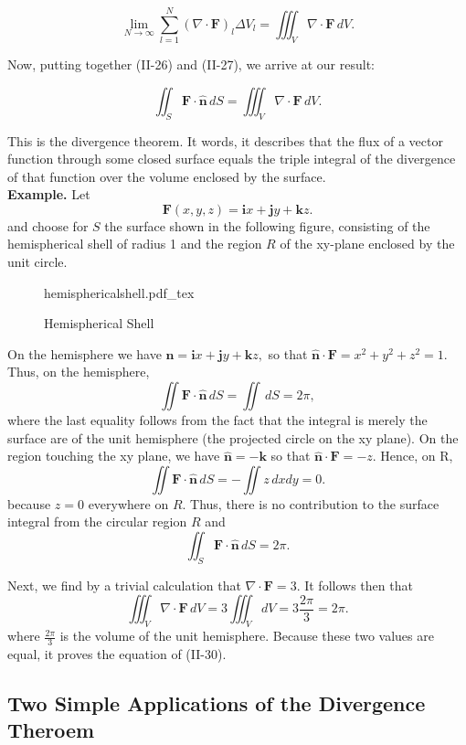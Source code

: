 \documentclass[11pt]{article}
\newcommand{\incfig}[2][1]{%
    \def\svgwidth{#1\columnwidth}
    {#2.pdf_tex}
}
\begin{document}
\[
	\lim_{N \rightarrow \infty} \sum_{l=1}^N (\nabla \cdot \mathbf{F})_l \Delta V_l = \iiint_V \nabla  \cdot \mathbf{F} \, dV \tag{II-29}
.\]

Now, putting together (II-26) and (II-27), we arrive at our result:

\[
	\iint_S \mathbf{F} \cdot \mathbf{\hat{n}} \, dS = \iiint_V \nabla \cdot \mathbf{F} \, dV \tag{II-30}
.\]

This is the divergence theorem. It words, it describes that the flux of a vector function through some closed surface
equals the triple integral of the divergence of that function over the volume enclosed by the surface. \\
\textbf{Example.} Let
\[
	\mathbf{F} (x,y,z) = \mathbf{i}x + \mathbf{j}y + \mathbf{k} z
.\]
and choose for $S$ the surface shown in the following figure, consisting of the hemispherical shell of radius 1 and the region $R$ of the xy-plane enclosed by the unit circle.

\begin{figure}[ht]
    \centering
    \incfig{hemisphericalshell}
    \caption{Hemispherical Shell}
    \label{fig:hemisphericalshell}
\end{figure}

On the hemisphere we have $\mathbf{\hat{n}} = \mathbf{i}x + \mathbf{j}y + \mathbf{k}z,$ so that $\mathbf{\hat{n}} \cdot \mathbf{F} = x^2 + y^2 + z^2 = 1$. Thus, on the hemisphere,
\[
	\iint \mathbf{F} \cdot \mathbf{\hat{n}} \, dS = \iint \, dS = 2\pi
,\]
where the last equality follows from the fact that the integral is merely the surface are of the unit hemisphere (the projected circle on the xy plane). On the region touching the xy plane, we have $\mathbf{\hat{n}} = -\mathbf{k}$ so that $\mathbf{\hat{n}} \cdot \mathbf{F} = - z$. Hence, on R,
\[
	\iint \mathbf{F} \cdot \mathbf{\hat{n}} \, dS = - \iint z \, dxdy = 0
.\]
because $z = 0$ everywhere on $R$. Thus, there is no contribution to the surface integral from the circular region $R$ and
\[
	\iint_S \mathbf{F} \cdot \mathbf{\hat{n}} \, dS = 2\pi
.\]

Next, we find by a trivial calculation that $\nabla \cdot \mathbf{F} = 3$. It follows then that
\[
	\iiint_V \nabla \cdot \mathbf{F} \, dV = 3 \iiint_V dV = 3\frac{2\pi}{3} = 2\pi
.\]
where $\frac{2\pi}{3}$ is the volume of the unit hemisphere. Because these two values are equal, it proves the equation of (II-30).

\subsection{Two Simple Applications of the Divergence Theroem}
\end{document}
